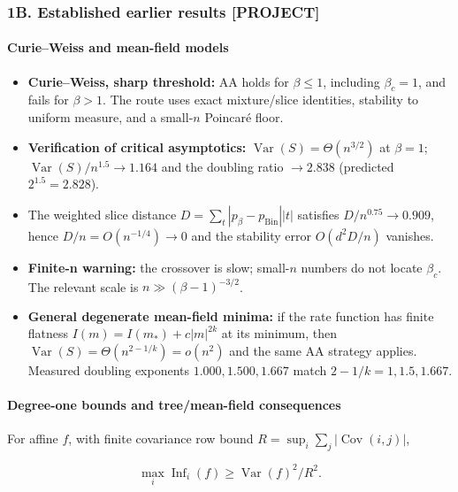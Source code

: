\subsubsection{1B. Established earlier results {[}PROJECT{]}}\label{b.-established-earlier-results-project}

\paragraph{Curie--Weiss and mean-field models}\label{curieweiss-and-mean-field-models}

\begin{itemize}
\tightlist
\item
  \textbf{Curie--Weiss, sharp threshold:} AA holds for \(\beta\le1\), including \(\beta_c=1\), and fails for \(\beta>1\). The route uses exact mixture/slice identities, stability to uniform measure, and a small-\(n\) Poincaré floor.
\item
  \textbf{Verification of critical asymptotics:}
  \(\operatorname{Var}(S)=\Theta(n^{3/2})\) at \(\beta=1\);
  \(\operatorname{Var}(S)/n^{1.5}\to1.164\) and the doubling ratio \(\to2.838\) (predicted \(2^{1.5}=2.828\)).
\item
  The weighted slice distance \(D=\sum_t|p_\beta-p_{\mathrm{Bin}}||t|\) satisfies
  \(D/n^{0.75}\to0.909\), hence \(D/n=O(n^{-1/4})\to0\) and the stability error \(O(d^2D/n)\) vanishes.
\item
  \textbf{Finite-n warning:} the crossover is slow; small-\(n\) numbers do not locate \(\beta_c\). The relevant scale is \(n\gg(\beta-1)^{-3/2}\).
\item
  \textbf{General degenerate mean-field minima:} if the rate function has finite flatness \(I(m)=I(m_*)+c|m|^{2k}\) at its minimum, then \(\operatorname{Var}(S)=\Theta(n^{2-1/k})=o(n^2)\) and the same AA strategy applies. Measured doubling exponents \(1.000,1.500,1.667\) match \(2-1/k=1,1.5,1.667\).
\end{itemize}

\paragraph{Degree-one bounds and tree/mean-field consequences}\label{degree-one-bounds-and-treemean-field-consequences}

For affine \(f\), with finite covariance row bound \(R=\sup_i\sum_j|\operatorname{Cov}(i,j)|\),

\[\max_i\operatorname{Inf}_i(f)\ge \operatorname{Var}(f)^2/R^2.\]

